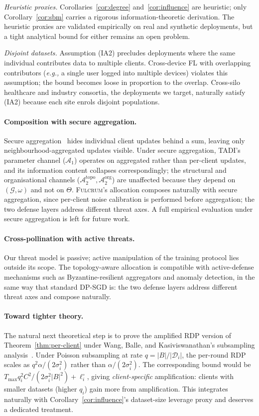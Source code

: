 \documentclass[letterpaper,journal]{IEEEtran}
\newcommand{\eg}{\textit{e.g.,}\xspace}
\newcommand{\TADI}{\textsc{TADI}\xspace}
\newcommand{\Fulcrum}{\textsc{Fulcrum}\xspace}
\newcommand{\Adv}{\mathcal{A}}
\newcommand{\Dset}{\mathcal{D}}
\newcommand{\TOPO}{\mathcal{G}}
\newcommand{\Tmax}{T_{\max}}
\begin{document}
\textit{Heuristic proxies.}
Corollaries~\ref{cor:degree} and~\ref{cor:influence} are heuristic;
only Corollary~\ref{cor:sbm} carries a rigorous information-theoretic
derivation. The heuristic proxies are validated empirically on real
and synthetic deployments, but a tight analytical bound for either
remains an open problem.

\textit{Disjoint datasets.}
Assumption (IA2) precludes deployments where the same individual
contributes data to multiple clients. Cross-device FL with overlapping
contributors (\eg a single user logged into multiple devices) violates
this assumption; the bound becomes loose in proportion to the overlap.
Cross-silo healthcare and industry consortia, the deployments we
target, naturally satisfy (IA2) because each site enrols disjoint
populations.

\paragraph{Composition with secure aggregation.}
Secure aggregation~\cite{bonawitz2017secagg} hides individual client
updates behind a sum, leaving only neighbourhood-aggregated updates
visible. Under secure aggregation, \TADI's parameter channel
($\Adv_1$) operates on aggregated rather than per-client updates, and
its information content collapses correspondingly; the structural and
organisational channels ($\Adv_2^{\text{topo}}, \Adv_2^{\text{org}}$)
are unaffected because they depend on $(\TOPO,\omega)$ and not on
$\Theta$. \Fulcrum's allocation composes naturally with secure
aggregation, since per-client noise calibration is performed before
aggregation; the two defense layers address different threat axes.
A full empirical evaluation under secure aggregation is left for
future work.

\paragraph{Cross-pollination with active threats.}
Our threat model is passive; active manipulation of the training
protocol lies outside its scope. The topology-aware allocation is
compatible with active-defense mechanisms such as Byzantine-resilient
aggregators and anomaly detection, in the same way that standard
DP-SGD is: the two defense layers address different threat axes and
compose naturally.

\paragraph{Toward tighter theory.}
The natural next theoretical step is to prove the amplified RDP version
of Theorem~\ref{thm:per-client} under Wang, Balle, and
Kasiviswanathan's subsampling analysis~\cite{wang2019subsampled}. Under
Poisson subsampling at rate $q = |B|/|\Dset_i|$, the per-round RDP
scales as $q^2 \alpha/(2\sigma_i^2)$ rather than $\alpha/(2\sigma_i^2)$.
The corresponding bound would be
\(\Tmax q_i^2 C^2 / (2\sigma_i^2 |B|^2) + \ell_i^\circ\), giving
\emph{client-specific} amplification: clients with smaller datasets
(higher $q_i$) gain more from amplification. This integrates naturally
with Corollary~\ref{cor:influence}'s dataset-size leverage proxy and
deserves a dedicated treatment.
\end{document}
